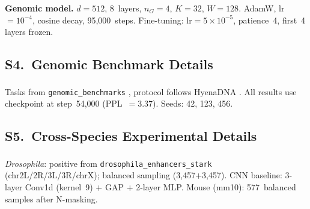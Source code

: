 \documentclass{article}
\newcommand{\citenum}[1]{%
  \textsuperscript{\rmfamily\upshape[#1]}}
\begin{document}
\textbf{Genomic model.}
$d = 512$, 8~layers, $n_G = 4$, $K = 32$, $W = 128$.
AdamW, lr$=10^{-4}$, cosine decay, 95{,}000~steps.
Fine-tuning: lr$=5\times10^{-5}$, patience~4, first~4 layers frozen.

\subsection*{S4.\ Genomic Benchmark Details}

Tasks from \texttt{genomic\_benchmarks}\citenum{18}, protocol follows
HyenaDNA\citenum{2}.
All results use checkpoint at step~54{,}000 (PPL~$=3.37$).
Seeds: 42, 123, 456.

\subsection*{S5.\ Cross-Species Experimental Details}

\textit{Drosophila}: positive from \texttt{drosophila\_enhancers\_stark}
\citenum{20} (chr2L/2R/3L/3R/chrX); balanced sampling
(3{,}457$+$3{,}457).
CNN baseline: 3-layer Conv1d (kernel~9) $+$ GAP $+$ 2-layer MLP.
Mouse (mm10): 577~balanced samples after N-masking.
\end{document}
